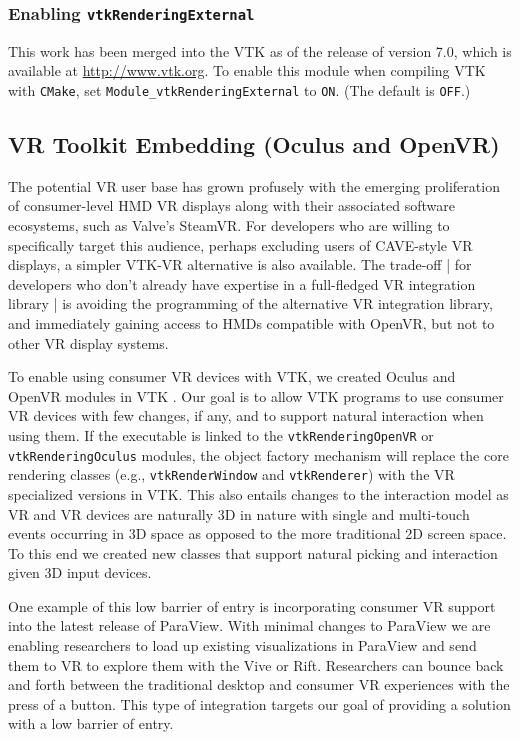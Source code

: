 \subsubsection{Enabling \texttt{vtkRenderingExternal}}

This work has been merged into the VTK as of the release of version 7.0, which is available at
\url{http://www.vtk.org}.
To enable this module when compiling VTK with \texttt{CMake},
set \texttt{Module\_vtkRenderingExternal} to \texttt{ON}. (The default is \texttt{OFF}.)

\subsection{VR Toolkit Embedding (Oculus and OpenVR)}

The potential VR user base has grown profusely with the emerging
proliferation of consumer-level HMD VR displays along with their associated
software ecosystems, such as Valve's SteamVR.
For developers who are willing to specifically target this audience, perhaps
excluding users of CAVE-style VR displays, a simpler VTK-VR alternative is
also available.
The trade-off | for developers who don't already have expertise in a
full-fledged VR integration library | is avoiding the programming of
the alternative VR integration library, and immediately gaining access
to HMDs compatible with OpenVR, but not to other VR display systems.

To enable using consumer VR devices with VTK, we created Oculus and OpenVR modules in VTK .
Our goal is to allow VTK programs to use consumer VR devices with few changes, if any, and to support natural interaction when using them.
If the executable is linked to the \texttt{vtkRenderingOpenVR} or \texttt{vtkRenderingOculus} modules, the object factory
mechanism will replace the core rendering classes (e.g.,
\texttt{vtkRenderWindow} and \texttt{vtkRenderer}) with the VR specialized versions in VTK.  This also entails changes to the 
interaction model as VR and VR devices are naturally 3D in nature with single and multi-touch events occurring in 3D space as 
opposed to the more traditional 2D screen space. To this end we created new classes that support natural picking and interaction given 3D 
input devices.

One example of this low barrier of entry is incorporating consumer VR support into the latest release of ParaView. With minimal changes to ParaView we are enabling researchers to load up existing visualizations in ParaView and send them to VR to explore them with the Vive or Rift. Researchers can bounce back and forth between the traditional desktop and consumer VR experiences with the press of a button. This type of integration targets our goal of providing a solution with a low barrier of entry.

